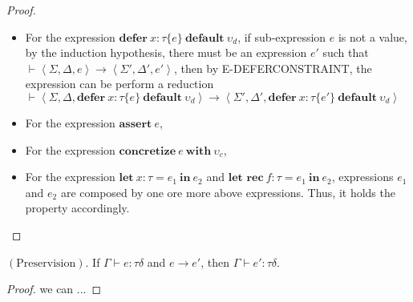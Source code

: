 \begin{proof}
\begin{itemize}
            \item For the expression $\textbf{defer}~x:\tau\{e\}~\textbf{default}~\upsilon_d$, if sub-expression $e$ is not a value, by the induction hypothesis, there must be an expression $e' $ such that $\vdash\left\langle\Sigma, \Delta, e\right\rangle\rightarrow\left\langle\Sigma',\Delta',e'\right\rangle$, then by E-DEFERCONSTRAINT, the expression can be perform a reduction $\vdash\left\langle\Sigma, \Delta, \textbf{defer}~x: \tau\{e\}~\textbf{default}~\upsilon_d \right\rangle\rightarrow\left\langle\Sigma',\Delta',\textbf{defer}~x:\tau\{e'\}~\textbf{default}~\upsilon_d\right\rangle$
            \item For the expression $\textbf{assert}~e$,
            \item For the expression $\textbf{concretize}~e~\textbf{with}~\upsilon_c$,
            \item For the expression $\textbf{let}~x:\tau=e_1~\textbf{in}~e_2$ and $\textbf{let rec}~f:\tau=e_1~\textbf{in}~e_2$, expressions $e_1$ and $e_2$ are composed by one ore more above expressions. Thus, it holds the property accordingly.
        \end{itemize}
    \end{proof}
    
    \begin{theorem}
        $\mathrm{(Preservision).}$ If $\Gamma\vdash e:\tau\delta$ and $e\rightarrow e'$, then $\Gamma\vdash e':\tau\delta$. 
    \end{theorem}
    \begin{proof}
        we can ...
    \end{proof}
